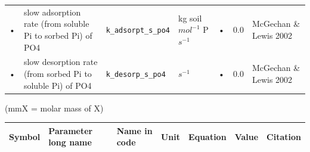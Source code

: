 \begin{table}
\begin{tabularx}{\linewidth}{|c|X|l|l|c|l|X|}
• & slow adsorption rate (from soluble Pi to sorbed Pi) of PO4 & \texttt{k\_adsorpt\_s\_po4} & kg soil $mol^{-1}$ P $s^{-1}$ & • & 0.0 & McGechan \& Lewis 2002 \\
• & slow desorption rate (from sorbed Pi to soluble Pi) of PO4 & \texttt{k\_desorp\_s\_po4} & $s^{-1}$ & • & 0.0 & McGechan \& Lewis 2002 \\
\hline 
\end{tabularx}
(mmX = molar mass of X)
\end{table}


\begin{table}
\begin{tabularx}{\linewidth}{|c|X|l|l|c|l|X|} %
\hline 
Symbol & Parameter long name & Name in code & Unit & Equation & Value & Citation \\ 
\hline 


\end{tabularx}
\end{table}
